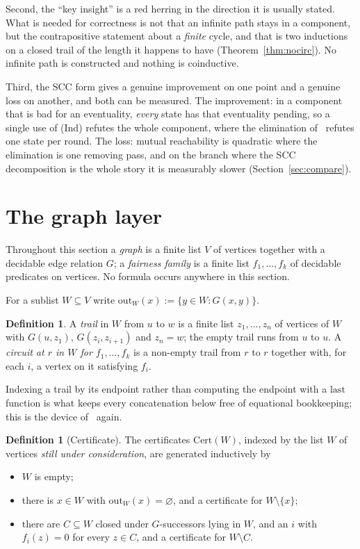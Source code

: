 \documentclass[11pt,a4paper]{article}
\theoremstyle{definition}
\newtheorem{definition}[theorem]{Definition}
\newcommand{\outs}{\mathrm{out}}
\begin{document}
Second, the ``key insight'' is a red herring in the direction it is usually
stated.  What is needed for correctness is not that an infinite path stays in a
component, but the contrapositive statement about a \emph{finite} cycle, and
that is two inductions on a closed trail of the length it happens to have
(Theorem~\ref{thm:nocirc}).  No infinite path is constructed and nothing is
coinductive.

Third, the SCC form gives a genuine improvement on one point and a genuine loss
on another, and both can be measured.  The improvement: in a component that is
bad for an eventuality, \emph{every} state has that eventuality pending, so a
single use of (Ind) refutes the whole component, where the elimination
of~\cite{m4} refutes one state per round.  The loss: mutual reachability is
quadratic where the elimination is one removing pass, and on the branch where
the SCC decomposition is the whole story it is measurably slower
(Section~\ref{sec:compare}).

\section{The graph layer}\label{sec:graph}

Throughout this section a \emph{graph} is a finite list $V$ of vertices
together with a decidable edge relation $G$; a \emph{fairness family} is a
finite list $f_1,\dots,f_k$ of decidable predicates on vertices.  No formula
occurs anywhere in this section.

For a sublist $W\subseteq V$ write $\outs_W(x):=\{y\in W: G(x,y)\}$.

\begin{definition}
A \emph{trail} in $W$ from $u$ to $w$ is a finite list $z_1,\dots,z_n$ of
vertices of $W$ with $G(u,z_1)$, $G(z_i,z_{i+1})$ and $z_n=w$; the empty trail
runs from $u$ to $u$.  A \emph{circuit at $r$ in $W$ for $f_1,\dots,f_k$} is a
non-empty trail from $r$ to $r$ together with, for each $i$, a vertex on it
satisfying $f_i$.
\end{definition}

Indexing a trail by its endpoint rather than computing the endpoint with a
$\mathrm{last}$ function is what keeps every concatenation below free of
equational bookkeeping; this is the device of~\cite[\S4c]{m4} again.

\begin{definition}[Certificate]\label{def:cert}
The certificates $\mathrm{Cert}(W)$, indexed by the list $W$ of vertices
\emph{still under consideration}, are generated inductively by
\begin{itemize}
\item[(C0)] $W$ is empty;
\item[(C1)] there is $x\in W$ with $\outs_W(x)=\varnothing$, and a certificate
  for $W\setminus\{x\}$;
\item[(C2)] there are $C\subseteq W$ closed under $G$-successors lying in $W$,
  and an $i$ with $f_i(z)=0$ for every $z\in C$, and a certificate for
  $W\setminus C$.
\end{itemize}
\end{definition}
\end{document}
